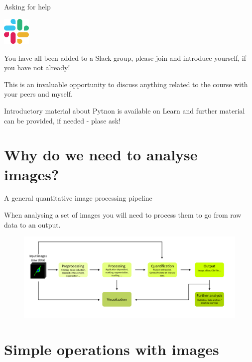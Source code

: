 \documentclass[9pt, aspectratio=169]{beamer}
\begin{document}
\begin{frame}
    {Asking for help}
    \begin{center}
        \includegraphics[width=0.1\textwidth]{slack.png}
    \end{center}

    You have all been added to a Slack group, please join and introduce yourself, if you have not already!

    This is an invaluable opportunity to discuss anything related to the course with your peers and myself.

    Introductory material about Pytnon is available on Learn and further material can be provided, if needed - plase ask!
\end{frame}
\section{Why do we need to analyse images?}

\begin{frame}
    {A general quantitative image processing pipeline}

    When analysing a set of images you will need to process them to go from raw data to an output.

    \begin{figure}
        \centering
        \includegraphics[width=\textwidth]{pipeline.png}
    \end{figure}

\end{frame}

\section{Simple operations with images}
\end{document}
